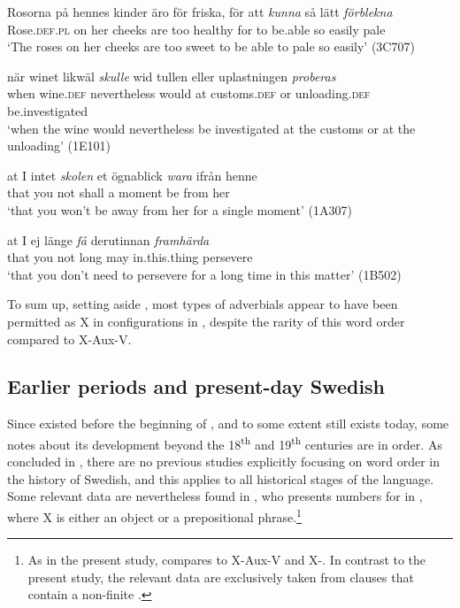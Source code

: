 \documentclass[output=paper, colorlinks, citecolor=brown]{langscibook}
\begin{document}
\ea
\label{ex:sangfelt:26}
\ea \label{ex:sangfelt:26a}
\gll Rosorna på hennes kinder äro för friska, för att \textit{kunna} {så} {lätt} \textit{förblekna}\\ %
 Rose.\textsc{def.pl} on her cheeks are too healthy for to be.able so easily pale\\
\glt ‘The roses on her cheeks are too sweet to be able to pale so easily’ (3C707)

\ex\label{ex:sangfelt:26b}
\gll när winet likwäl \textit{skulle} {wid} {tullen} {eller} {uplastningen} \textit{proberas}\\
 when wine.\textsc{def} nevertheless would at customs.\textsc{def} or unloading.\textsc{def} be.investigated\\
\glt ‘when the wine would nevertheless be investigated at the customs or at the unloading’ (1E101)

\ex\label{ex:sangfelt:26c}
\gll at I intet \textit{skolen} {et} {ögnablick} \textit{wara} ifrån henne \\
 that you not shall a moment be from her\\
\glt ‘that you won’t be away from her for a single moment’ (1A307)

\ex\label{ex:sangfelt:26d}
\gll at I ej länge \textit{få} {derutinnan} \textit{framhärda} \\
 that you not long may in.this.thing persevere\\
\glt ‘that you don’t need to persevere for a long time in this matter’ (1B502)
\z
\z 


 To sum up, setting aside , most types of adverbials appear to have been permitted as X in  configurations in , despite the rarity of this word order compared to X-Aux-V.

\subsection{Earlier periods and present-day Swedish}\label{sec:sangfelt:4.3}\largerpage[2]

 Since  existed before the beginning of , and to some extent still exists today, some notes about its development beyond the 18\textsuperscript{th} and 19\textsuperscript{th} centuries are in order. As concluded in , there are no previous studies explicitly focusing on  word order in the history of Swedish, and this applies to all historical stages of the language. Some relevant data are nevertheless found in \citet{Sangfelt2019}, who presents numbers for  in , where X is either an object or a prepositional phrase.\footnote{As in the present study, \citet{Sangfelt2019} compares  to X-Aux-V and X-. In contrast to the present study, the relevant data are exclusively taken from clauses that contain a non-finite .}
\end{document}

